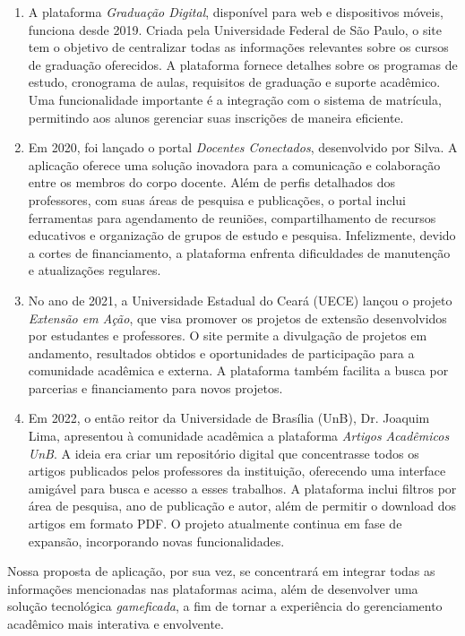 \documentclass[a4paper,12pt]{report}
\begin{document}
\begin{enumerate}
\item A plataforma \emph{Graduação Digital}, disponível para web e dispositivos móveis, funciona desde 2019. Criada pela Universidade Federal de São Paulo, o site tem o objetivo de centralizar todas as informações relevantes sobre os cursos de graduação oferecidos. A plataforma fornece detalhes sobre os programas de estudo, cronograma de aulas, requisitos de graduação e suporte acadêmico. Uma funcionalidade importante é a integração com o sistema de matrícula, permitindo aos alunos gerenciar suas inscrições de maneira eficiente.

\item Em 2020, foi lançado o portal \emph{Docentes Conectados}, desenvolvido por Silva. A aplicação oferece uma solução inovadora para a comunicação e colaboração entre os membros do corpo docente. Além de perfis detalhados dos professores, com suas áreas de pesquisa e publicações, o portal inclui ferramentas para agendamento de reuniões, compartilhamento de recursos educativos e organização de grupos de estudo e pesquisa. Infelizmente, devido a cortes de financiamento, a plataforma enfrenta dificuldades de manutenção e atualizações regulares.

\item No ano de 2021, a Universidade Estadual do Ceará (UECE) lançou o projeto \emph{Extensão em Ação}, que visa promover os projetos de extensão desenvolvidos por estudantes e professores. O site permite a divulgação de projetos em andamento, resultados obtidos e oportunidades de participação para a comunidade acadêmica e externa. A plataforma também facilita a busca por parcerias e financiamento para novos projetos.

\item Em 2022, o então reitor da Universidade de Brasília (UnB), Dr. Joaquim Lima, apresentou à comunidade acadêmica a plataforma \emph{Artigos Acadêmicos UnB}. A ideia era criar um repositório digital que concentrasse todos os artigos publicados pelos professores da instituição, oferecendo uma interface amigável para busca e acesso a esses trabalhos. A plataforma inclui filtros por área de pesquisa, ano de publicação e autor, além de permitir o download dos artigos em formato PDF. O projeto atualmente continua em fase de expansão, incorporando novas funcionalidades.

\end{enumerate}
Nossa proposta de aplicação, por sua vez, se concentrará em integrar todas as informações mencionadas nas plataformas acima, além de desenvolver uma solução tecnológica \textit{gameficada}, a fim de tornar a experiência do gerenciamento acadêmico mais interativa e envolvente.
\end{document}
